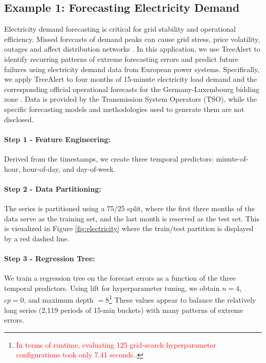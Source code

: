 \documentclass[12pt]{article}
\newcommand{\matt}[1]{\textcolor{red}{#1}}
\begin{document}
\subsection{Example 1: Forecasting Electricity Demand}
Electricity demand forecasting is critical for grid stability and operational efficiency. Missed forecasts of demand peaks can cause grid stress, price volatility, outages and affect distribution networks \citep{ciarreta2023, gilbert2023, steinbuks2019}. In this application, we use TreeAlert to identify recurring patterns of extreme forecasting errors and predict future failures using electricity demand data from European power systems. Specifically, we apply TreeAlert to four months of 15-minute electricity load demand and the corresponding official operational forecasts for the Germany-Luxembourg bidding zone %
\citep{entsoe2025}. Data is provided by the Transmission System Operators (TSO), while the specific forecasting models and methodologies used to generate them are not disclosed. %

\paragraph{Step 1 - Feature Engineering:}
Derived from the timestamps, we create three temporal predictors: minute-of-hour, hour-of-day, and day-of-week.

\paragraph{Step 2 - Data Partitioning:} The series is partitioned using a 75/25 split, where the first three months of the data serve as the training set, and the last month is reserved as the test set. This is visualized in Figure \ref{fig:electricity} where the train/test partition is displayed by a red dashed line.

\paragraph{Step 3 - Regression Tree:} We train a regression tree on the forecast errors as a function of the three temporal predictors. Using lift for hyperparameter tuning, we obtain $n = 4$, $cp = 0$, and maximum depth $=8$\footnote{\matt{In terms of runtime, evaluating 125 grid-search hyperparameter configurations took only 7.41 seconds.}.} These values appear to balance the relatively long series %
(2,119 periods of 15-min buckets) with many patterns of extreme errors. %
\end{document}
